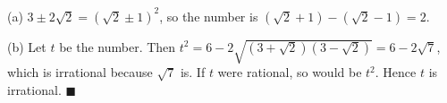 (a) $3\pm2\sqrt2=(\sqrt2\pm1)^2$, so the number is $(\sqrt2+1)-(\sqrt2-1)=\boxed{2}$.

(b) Let $t$ be the number. Then $t^2=6-2\sqrt{(3+\sqrt2)(3-\sqrt2)}=6-2\sqrt7$, which is irrational because $\sqrt7$ is. If $t$ were rational, so would be $t^2$. Hence $t$ is irrational. $\blacksquare$
